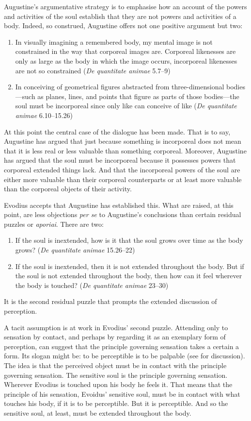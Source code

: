 \documentclass[12pt]{article}
\begin{document}
Augustine’s argumentative strategy is to emphasise how an account of the powers and activities of the soul establish that they are not powers and activities of a body. Indeed, so construed, Augustine offers not one positive argument but two:
\begin{enumerate}
	\item In visually imagining a remembered body, my mental image is not constrained in the way that corporeal images are. Corporeal likenesses are only as large as the body in which the image occurs, incorporeal likenesses are not so constrained (\emph{De quantitate animae} 5.7–9)
	\item In conceiving of geometrical figures abstracted from three-dimensional bodies—such as planes, lines, and points that figure as parts of those bodies—the soul must be incorporeal since only like can conceive of like (\emph{De quantitate animae} 6.10–15.26)
\end{enumerate}
At this point the central case of the dialogue has been made. That is to say, Augustine has argued that just because something is incorporeal does not mean that it is less real or less valuable than something corporeal. Moreover, Augustine has argued that the soul must be incorporeal because it possesses powers that corporeal extended things lack. And that the incorporeal powers of the soul are either more valuable than their corporeal counterparts or at least more valuable than the corporeal objects of their activity. 


Evodius accepts that Augustine has established this. What are raised, at this point, are less objections \emph{per se} to Augustine's conclusions than certain residual puzzles or \emph{aporiai}. There are two:
\begin{enumerate}
	\item If the soul is inextended, how is it that the soul grows over time as the body grows? (\emph{De quantitate animae} 15.26–22)
	\item If the soul is inextended, then it is not extended throughout the body. But if the soul is not extended throughout the body, then how can it feel wherever the body is touched? (\emph{De quantitate animae} 23–30)
\end{enumerate}
It is the second residual puzzle that prompts the extended discussion of perception.
	
A tacit assumption is at work in Evodius' second puzzle. Attending only to sensation by contact, and perhaps by regarding it as an exemplary form of perception, can suggest that the principle governing sensation takes a certain a form. Its slogan might be: to be perceptible is to be palpable (see \citealt{Kalderon:2015fr} for discussion). The idea is that the perceived object must be in contact with the principle governing sensation. The sensitive soul is the principle governing sensation. Wherever Evodius is touched upon his body he feels it. That means that the principle of his sensation, Evoidus' sensitive soul, must be in contact with what touches his body, if it is to be perceptible. But it is perceptible. And so the sensitive soul, at least, must be extended throughout the body.
\end{document}
